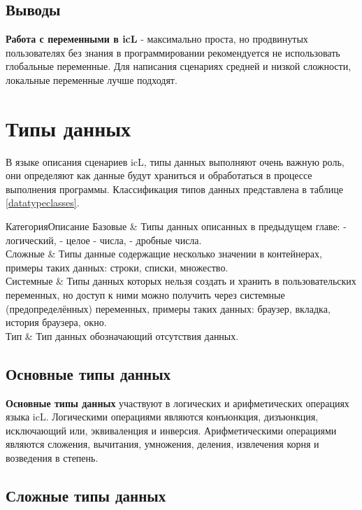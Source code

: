 \documentclass[a4paper, 14pt]{extarticle}
\begin{document}
\subsection{Выводы}

	{\bf Работа с переменными в icL} - максимально проста, но продвинутых пользователях без знания в программировании рекомендуется не использовать глобальные переменные. Для написания сценариях средней и низкой сложности, локальные переменные лучше подходят. 

\section{Типы данных}

	В языке описания сценариев icL, типы данных выполняют очень важную роль, они определяют как данные будут храниться и обработаться в процессе выполнения программы. Классификация типов данных представлена в таблице \ref{datatypeclasses}.
	
	{Категория}{Описание}
	{
	Базовые & Типы данных описанных в предыдущем главе:  - логический,  - целое - числа,  - дробные числа. \\ \hline
	Сложные & Типы данные содержащие несколько значении в контейнерах, примеры таких данных: строки, списки, множество. \\ \hline
	Системные & Типы данных которых нельзя создать и хранить в пользовательских переменных, но доступ к ними можно получить через системные (предопределённых) переменных, примеры таких данных: браузер, вкладка, история браузера, окно. \\ \hline
	Тип  & Тип данных обозначающий отсутствия данных.
	}
	
\subsection{Основные типы данных}

	{\bf Основные типы данных} участвуют в логических и арифметических операциях языка icL. Логическими операциями являются конъюнкция, дизъюнкция, исключающий или, эквиваленция и инверсия. Арифметическими операциями являются сложения, вычитания, умножения, деления, извлечения корня и возведения в степень.
	
\subsection{Сложные типы данных}
\end{document}
